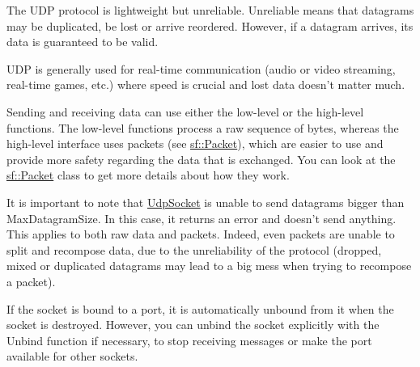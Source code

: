 The U\-D\-P protocol is lightweight but unreliable. Unreliable means that datagrams may be duplicated, be lost or arrive reordered. However, if a datagram arrives, its data is guaranteed to be valid.

U\-D\-P is generally used for real-\/time communication (audio or video streaming, real-\/time games, etc.) where speed is crucial and lost data doesn't matter much.

Sending and receiving data can use either the low-\/level or the high-\/level functions. The low-\/level functions process a raw sequence of bytes, whereas the high-\/level interface uses packets (see \hyperlink{classsf_1_1_packet}{sf\-::\-Packet}), which are easier to use and provide more safety regarding the data that is exchanged. You can look at the \hyperlink{classsf_1_1_packet}{sf\-::\-Packet} class to get more details about how they work.

It is important to note that \hyperlink{classsf_1_1_udp_socket}{Udp\-Socket} is unable to send datagrams bigger than Max\-Datagram\-Size. In this case, it returns an error and doesn't send anything. This applies to both raw data and packets. Indeed, even packets are unable to split and recompose data, due to the unreliability of the protocol (dropped, mixed or duplicated datagrams may lead to a big mess when trying to recompose a packet).

If the socket is bound to a port, it is automatically unbound from it when the socket is destroyed. However, you can unbind the socket explicitly with the Unbind function if necessary, to stop receiving messages or make the port available for other sockets.

